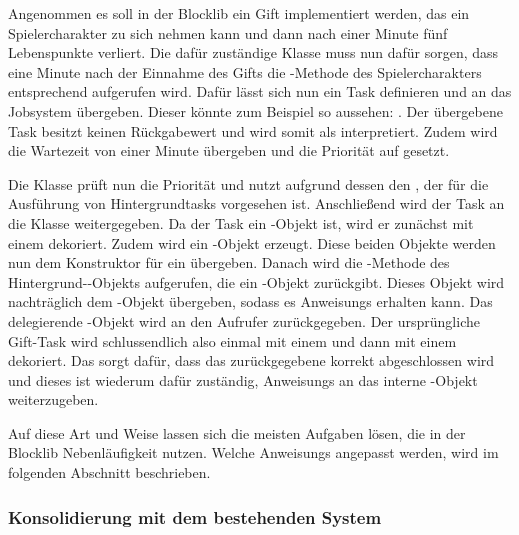\begin{example}
	Angenommen es soll in der Blocklib ein Gift implementiert werden, das ein Spielercharakter zu sich nehmen kann und dann nach einer Minute fünf Lebenspunkte verliert. Die dafür zuständige Klasse muss nun dafür sorgen, dass eine Minute nach der Einnahme des Gifts die -Methode des Spielercharakters entsprechend aufgerufen wird. Dafür lässt sich nun ein Task definieren und an das Jobsystem übergeben. Dieser könnte zum Beispiel so aussehen: . Der übergebene Task besitzt keinen Rückgabewert und wird somit als \classRunnable{} interpretiert. Zudem wird die Wartezeit von einer Minute übergeben und die Priorität auf  gesetzt.

	Die Klasse \classBlocklibExecutor{} prüft nun die Priorität und nutzt aufgrund dessen den \classExecutorService{}, der für die Ausführung von Hintergrundtasks vorgesehen ist. Anschließend wird der Task an die Klasse \classCompletableFutureWrapper{} weitergegeben. Da der Task ein \classRunnable{}-Objekt ist, wird er zunächst mit einem \classRunnableCallable{} dekoriert. Zudem wird ein \classDelegatingScheduledCompletableFuture{}-Objekt erzeugt. Diese beiden Objekte werden nun dem Konstruktor für ein \classCompletingCallable{} übergeben. Danach wird die -Methode des Hintergrund-\classScheduledThreadPoolExecutor{}-Objekts aufgerufen, die ein \classFuture{}-Objekt zurückgibt. Dieses Objekt wird nachträglich dem \classDelegatingScheduledCompletableFuture{}-Objekt übergeben, sodass es \glspl{Anweisung} erhalten kann. Das delegierende \classCompletableFuture{}-Objekt wird an den Aufrufer zurückgegeben. Der ursprüngliche Gift-Task wird schlussendlich also einmal mit einem \classRunnableCallable{} und dann mit einem \classCompletingCallable{} dekoriert. Das \classCompletingCallable{} sorgt dafür, dass das zurückgegebene \classCompletableFuture{} korrekt abgeschlossen wird und dieses ist wiederum dafür zuständig, \glspl{Anweisung} an das interne \classFuture{}-Objekt weiterzugeben.
\end{example}

Auf diese Art und Weise lassen sich die meisten Aufgaben lösen, die in der Blocklib Nebenläufigkeit nutzen. Welche \glspl{Anweisung} angepasst werden, wird im folgenden Abschnitt beschrieben.

\subsubsection{Konsolidierung mit dem bestehenden System}\label{sec:Konsolidierung}

